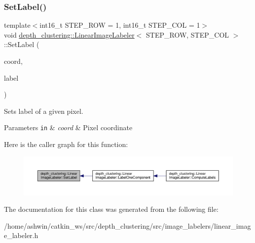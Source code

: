 \subsubsection{\texorpdfstring{Set\+Label()}{SetLabel()}}
{\footnotesize\ttfamily template$<$int16\+\_\+t S\+T\+E\+P\+\_\+\+R\+OW = 1, int16\+\_\+t S\+T\+E\+P\+\_\+\+C\+OL = 1$>$ \\
void \hyperlink{classdepth__clustering_1_1LinearImageLabeler}{depth\+\_\+clustering\+::\+Linear\+Image\+Labeler}$<$ S\+T\+E\+P\+\_\+\+R\+OW, S\+T\+E\+P\+\_\+\+C\+OL $>$\+::Set\+Label (\begin{DoxyParamCaption}\item[{const \hyperlink{structdepth__clustering_1_1PixelCoord}{Pixel\+Coord} \&}]{coord,  }\item[{uint16\+\_\+t}]{label }\end{DoxyParamCaption})\hspace{0.3cm}{\ttfamily [inline]}}



Sets label of a given pixel. 


\begin{DoxyParams}[1]{Parameters}
\mbox{\tt in}  & {\em coord} & Pixel coordinate \\
\hline
\end{DoxyParams}
Here is the caller graph for this function\+:\nopagebreak
\begin{figure}[H]
\begin{center}
\leavevmode
\includegraphics[width=350pt]{classdepth__clustering_1_1LinearImageLabeler_a4693e920b2245f70206a11e141ddcb8f_icgraph}
\end{center}
\end{figure}


The documentation for this class was generated from the following file\+:\begin{DoxyCompactItemize}
\item 
/home/ashwin/catkin\+\_\+ws/src/depth\+\_\+clustering/src/image\+\_\+labelers/linear\+\_\+image\+\_\+labeler.\+h\end{DoxyCompactItemize}
